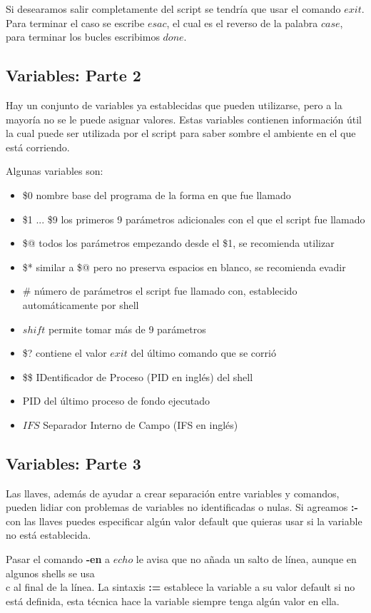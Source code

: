 \documentclass{article}
\begin{document}
Si desearamos salir completamente del script se tendría que usar el comando $exit$. Para terminar el caso se escribe $esac$, el cual es el reverso de la palabra $case$, para terminar los bucles escribimos $done$.

\subsection{Variables: Parte 2}
Hay un conjunto de variables ya establecidas que pueden utilizarse, pero a la mayoría no se le puede asignar valores. Estas variables contienen información útil la cual puede ser utilizada por el script para saber sombre el ambiente en el que está corriendo.

Algunas variables son:
\begin{itemize}
\item \$0				nombre base del programa de la forma en que fue llamado
\item \$1 ... \$9		los primeros 9 parámetros adicionales con el que el script fue llamado
\item \$@ 			todos los parámetros empezando desde el \$1, se recomienda utilizar
\item \$* 			similar a \$@ pero no preserva espacios en blanco, se recomienda evadir
\item \# 				número de parámetros el script fue llamado con, establecido automáticamente por shell
\item $shift$			permite tomar más de 9 parámetros
\item \$?				contiene el valor $exit$ del último comando que se corrió
\item \$\$ 			IDentificador de Proceso (PID en inglés) del shell
\item \!				PID del último proceso de fondo ejecutado
\item $IFS$			Separador Interno de Campo (IFS en inglés)
\end{itemize}

\subsection{Variables: Parte 3}
Las llaves, además de ayudar a crear separación entre variables y comandos, pueden lidiar con problemas de variables no identificadas o nulas. Si agreamos \textbf{:-} con las llaves puedes especificar algún valor default que quieras usar si la variable no está establecida.

Pasar el comando \textbf{-en} a $echo$ le avisa que no añada un salto de línea, aunque en algunos shells se usa \\c al final de la línea. La sintaxis \textbf{:=} establece la variable a su valor default si no está definida, esta técnica hace la variable siempre tenga algún valor en ella.
\end{document}
